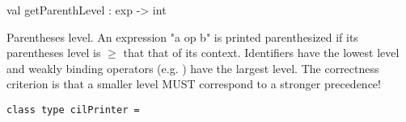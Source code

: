\documentclass[11pt]{article}
\begin{document}
\label{val:Cil.getParenthLevel}\begin{ocamldoccode}
val getParenthLevel : exp -> int
\end{ocamldoccode}
\begin{ocamldocdescription}
Parentheses level. An expression "a op b" is printed parenthesized if its 
 parentheses level is $\geq$ that that of its context. Identifiers have the 
 lowest level and weakly binding operators (e.g. \textbar ) have the largest level. 
 The correctness criterion is that a smaller level MUST correspond to a 
 stronger precedence!


\end{ocamldocdescription}




\begin{ocamldoccode}
{\tt{class type cilPrinter = }}\end{ocamldoccode}
\label{classtype:Cil.cilPrinter}
\end{document}
